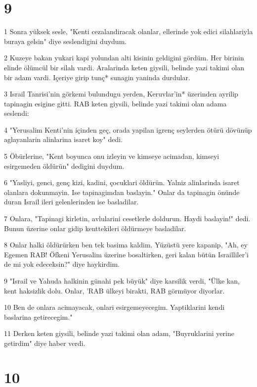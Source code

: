 \chapter{9}

\par 1 Sonra yüksek sesle, "Kenti cezalandiracak olanlar, ellerinde yok edici silahlariyla buraya gelsin" diye seslendigini duydum.
\par 2 Kuzeye bakan yukari kapi yolundan alti kisinin geldigini gördüm. Her birinin elinde ölümcül bir silah vardi. Aralarinda keten giysili, belinde yazi takimi olan bir adam vardi. Içeriye girip tunç* sunagin yaninda durdular.
\par 3 Israil Tanrisi'nin görkemi bulundugu yerden, Keruvlar'in* üzerinden ayrilip tapinagin esigine gitti. RAB keten giysili, belinde yazi takimi olan adama seslendi:
\par 4 "Yerusalim Kenti'nin içinden geç, orada yapilan igrenç seylerden ötürü dövünüp aglayanlarin alinlarina isaret koy" dedi.
\par 5 Öbürlerine, "Kent boyunca onu izleyin ve kimseye acimadan, kimseyi esirgemeden öldürün" dedigini duydum.
\par 6 "Yasliyi, genci, genç kizi, kadini, çocuklari öldürün. Yalniz alinlarinda isaret olanlara dokunmayin. Ise tapinagimdan baslayin." Onlar da tapinagin önünde duran Israil ileri gelenlerinden ise basladilar.
\par 7 Onlara, "Tapinagi kirletin, avlularini cesetlerle doldurun. Haydi baslayin!" dedi. Bunun üzerine onlar gidip kenttekileri öldürmeye basladilar.
\par 8 Onlar halki öldürürken ben tek basima kaldim. Yüzüstü yere kapanip, "Ah, ey Egemen RAB! Öfkeni Yerusalim üzerine bosaltirken, geri kalan bütün Israilliler'i de mi yok edeceksin?" diye haykirdim.
\par 9 "Israil ve Yahuda halkinin günahi pek büyük" diye karsilik verdi, "Ülke kan, kent haksizlik dolu. Onlar, 'RAB ülkeyi birakti, RAB görmüyor diyorlar.
\par 10 Ben de onlara acimayacak, onlari esirgemeyecegim. Yaptiklarini kendi baslarina getirecegim."
\par 11 Derken keten giysili, belinde yazi takimi olan adam, "Buyruklarini yerine getirdim" diye haber verdi.

\chapter{10}

